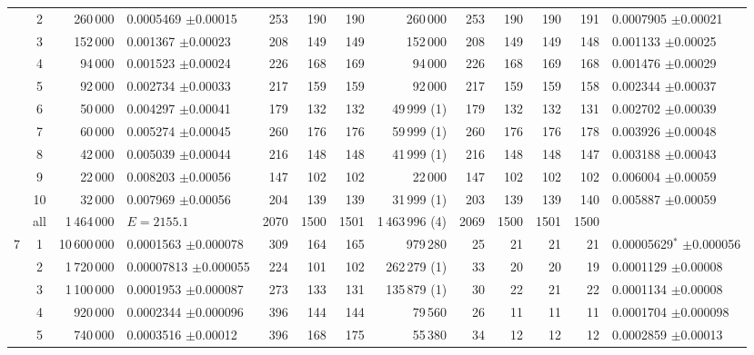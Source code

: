 \begin{tabular}{@{}ccrlrrrrrrrrl@{}}
 & 2 & 260\,000 & 0.0005469 {\tiny$\pm$0.00015} & 253 & 190 & 190 & 260\,000 & 253 & 190 & 190 & 191 & 0.0007905 {\tiny$\pm$0.00021} \\
 & 3 & 152\,000 & 0.001367 {\tiny$\pm$0.00023} & 208 & 149 & 149 & 152\,000 & 208 & 149 & 149 & 148 & 0.001133 {\tiny$\pm$0.00025} \\
 & 4 & 94\,000 & 0.001523 {\tiny$\pm$0.00024} & 226 & 168 & 169 & 94\,000 & 226 & 168 & 169 & 168 & 0.001476 {\tiny$\pm$0.00029} \\
 & 5 & 92\,000 & 0.002734 {\tiny$\pm$0.00033} & 217 & 159 & 159 & 92\,000 & 217 & 159 & 159 & 158 & 0.002344 {\tiny$\pm$0.00037} \\
 & 6 & 50\,000 & 0.004297 {\tiny$\pm$0.00041} & 179 & 132 & 132 & 49\,999 (1) & 179 & 132 & 132 & 131 & 0.002702 {\tiny$\pm$0.00039} \\
 & 7 & 60\,000 & 0.005274 {\tiny$\pm$0.00045} & 260 & 176 & 176 & 59\,999 (1) & 260 & 176 & 176 & 178 & 0.003926 {\tiny$\pm$0.00048} \\
 & 8 & 42\,000 & 0.005039 {\tiny$\pm$0.00044} & 216 & 148 & 148 & 41\,999 (1) & 216 & 148 & 148 & 147 & 0.003188 {\tiny$\pm$0.00043} \\
 & 9 & 22\,000 & 0.008203 {\tiny$\pm$0.00056} & 147 & 102 & 102 & 22\,000 & 147 & 102 & 102 & 102 & 0.006004 {\tiny$\pm$0.00059} \\
 & 10 & 32\,000 & 0.007969 {\tiny$\pm$0.00056} & 204 & 139 & 139 & 31\,999 (1) & 203 & 139 & 139 & 140 & 0.005887 {\tiny$\pm$0.00059} \\
 & all & 1\,464\,000 & $E=2155.1$ & 2070 & 1500 & 1501 & 1\,463\,996 (4) & 2069 & 1500 & 1501 & 1500 &  \\
\midrule
7 & 1 & 10\,600\,000 & 0.0001563 {\tiny$\pm$0.000078} & 309 & 164 & 165 & 979\,280 & 25 & 21 & 21 & 21 & 0.00005629$^{\ast}$ {\tiny$\pm$0.000056} \\
 & 2 & 1\,720\,000 & 0.00007813 {\tiny$\pm$0.000055} & 224 & 101 & 102 & 262\,279 (1) & 33 & 20 & 20 & 19 & 0.0001129 {\tiny$\pm$0.00008} \\
 & 3 & 1\,100\,000 & 0.0001953 {\tiny$\pm$0.000087} & 273 & 133 & 131 & 135\,879 (1) & 30 & 22 & 21 & 22 & 0.0001134 {\tiny$\pm$0.00008} \\
 & 4 & 920\,000 & 0.0002344 {\tiny$\pm$0.000096} & 396 & 144 & 144 & 79\,560 & 26 & 11 & 11 & 11 & 0.0001704 {\tiny$\pm$0.000098} \\
 & 5 & 740\,000 & 0.0003516 {\tiny$\pm$0.00012} & 396 & 168 & 175 & 55\,380 & 34 & 12 & 12 & 12 & 0.0002859 {\tiny$\pm$0.00013} \\

\end{tabular}
